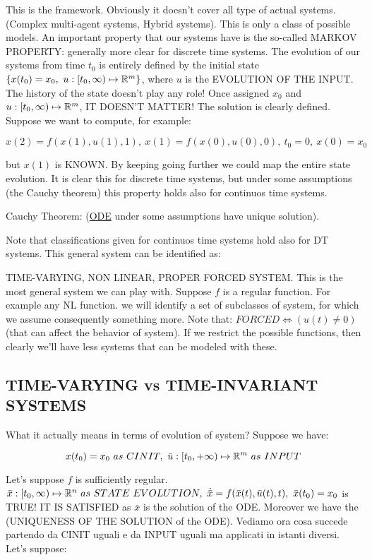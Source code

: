 This is the framework. Obviously it doesn't cover all type of actual systems. (Complex multi-agent systems, Hybrid systems). This is only a class of possible models.
An important property that our systems have is the so-called MARKOV PROPERTY: generally more clear for discrete time systems. The evolution of our systems from time $t_0$ is entirely defined by the initial state $\{x(t_0) = x_0,\ u : [t_0, \infty) \mapsto \mathbb{R}^m\}$, where $u$ is the EVOLUTION OF THE INPUT.
The history of the state doesn't play any role! Once assigned $x_0$ and $u : [t_0, \infty) \mapsto \mathbb{R}^m$, IT DOESN'T MATTER! The solution is clearly defined. Suppose we want to compute, for example:

\[
x(2) = f(x(1),u(1),1),\ x(1) = f(x(0),u(0),0),\ t_0 = 0,\ x(0) = x_0
\]

but $x(1)$ is KNOWN. By keeping going further we could map the entire state evolution. It is clear this for discrete time systems, but under some assumptions (the Cauchy theorem) this property holds also for continuos time systems.

Cauchy Theorem: (\underline{ODE} under some assumptions have unique solution).

\ctsys

Note that classifications given for continuos time systems hold also for DT systems.
This general system can be identified as:

TIME-VARYING, NON LINEAR, PROPER FORCED SYSTEM. This is the most general system we can play with. Suppose $f$ is a regular function. For example any NL function. we will identify a set of subclasses of system, for which we assume consequently something more.
Note that: $FORCED \iff (u(t) \neq 0)$ (that can affect the behavior of system).
If we restrict the possible functions, then clearly we'll have less systems that can be modeled with these.

\subsection{TIME-VARYING vs TIME-INVARIANT SYSTEMS}

What it actually means in terms of evolution of system? Suppose we have:

\[
	x(t_0) = x_0\ as\ CINIT,\ \bar{u} : [t_0, +\infty) \mapsto \mathbb{R}^m\ as\ INPUT
\]

Let's suppose $f$ is sufficiently regular. $\bar{x}: [t_0, \infty) \mapsto \mathbb{R}^n\ as\ STATE\ EVOLUTION,\ \dot{\bar{x}} = f(\bar{x}(t), \bar{u}(t), t),\ \bar{x}(t_0) = x_0$ is TRUE! IT IS SATISFIED as $\bar{x}$ is the solution of the ODE. Moreover we have the (UNIQUENESS OF THE SOLUTION of the ODE).
Vediamo ora cosa succede partendo da CINIT uguali e da INPUT uguali ma applicati in istanti diversi.
Let's suppose:

